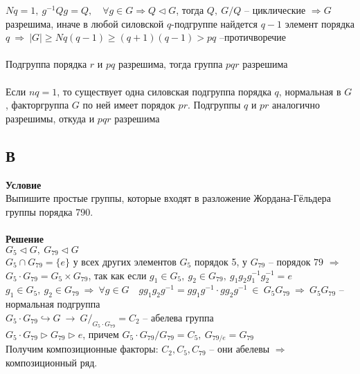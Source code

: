 		$Nq = 1,\ g^{-1}Qg = Q,\quad \forall g \in G \Rightarrow Q \lhd G$, тогда $Q,\ G\slash Q$ -- циклические $\Rightarrow G$ разрешима, иначе в любой силовской $q$-подгруппе найдется $q-1$ элемент порядка $q\ \Rightarrow\ |G| \geqslant Nq(q-1) \geqslant (q+1)(q-1) > pq$ --протичворечие\\
		\\
		Подгруппа порядка $r$ и $pq$ разрешима, тогда группа $pqr$ разрешима\\
		\\
		Если $nq = 1$, то существует одна силовская подгруппа порядка $q$, нормальная в $G$, факторгруппа $G$ по ней имеет порядок $pr$. Подгруппы $q$ и $pr$ аналогично разрешимы, откуда и $pqr$ разрешима\\
 					
		\subsection*{В}
		\textbf{Условие}\\
		Выпишите простые группы, которые входят в разложение Жордана-Гёльдера группы порядка 790.\\
		\\
		\textbf{Решение}\\
		$G_{5} \lhd G,\ G_{79} \lhd G$\\
		$G_{5} \cap G_{79} = \{e\}$ у всех других элементов $G_{5}$ порядок 5, у $G_{79}$ -- порядок $79$ $\Rightarrow$ $G_{5} \cdot G_{79} = G_{5} \times G_{79}$, так как если $g_1 \in G_{5},\ g_2 \in G_{79},\ g_{1}g_{2}g^{-1}_{1}g^{-1}_{2} = e$\\
		$g_{1} \in G_{5},\ g_{2} \in G_{79}\ \Rightarrow\ \forall g\in G\quad gg_{1}g_{2}g^{-1} = gg_{1}g^{-1} \cdot gg_{2}g^{-1}\ \in\ G_{5}G_{79}\ \Rightarrow\ G_{5}G_{79}$ -- нормальная подгруппа\\
		$G_{5} \cdot G_{79} \hookrightarrow G\ \to\ G\slash_{G_{5} \cdot G_{79}} = C_{2}$ -- абелева группа\\
		$G_{5} \cdot G_{79} \rhd G_{79} \rhd e$, причем $G_{5} \cdot G_{79}\slash G_{79} = C_{5},\ G_{79 \slash e} = G_{79}$\\
		Получим композиционные факторы: $C_{2}, C_{5}, C_{79}$ -- они абелевы $\Rightarrow$ композиционный ряд. 
		
